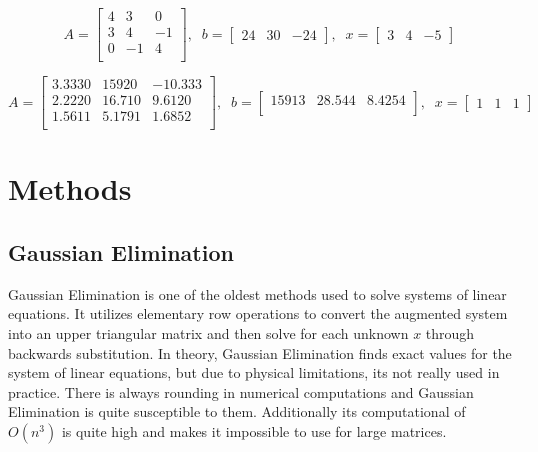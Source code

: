 \documentclass[11pt]{article}	%
\begin{document}
\begin{equation}\label{eq:sample3}
    A = \begin{bmatrix}
            4 & 3 & 0 \\
            3 & 4 & -1 \\
            0 & -1 & 4 \\
        \end{bmatrix}
    ,\;\;
    b = \begin{bmatrix}
            24 & 30 & -24
        \end{bmatrix}
    ,\;\;
    x = \begin{bmatrix}
            3 & 4 & -5
        \end{bmatrix}
\end{equation}

\begin{equation}\label{eq:sample4}
    A = \begin{bmatrix}
            3.3330 & 15920 & -10.333\\
            2.2220 & 16.710 & 9.6120\\
            1.5611 & 5.1791 & 1.6852\\
        \end{bmatrix}
    ,\;\;
    b = \begin{bmatrix}
            15913 & 28.544 & 8.4254\\
        \end{bmatrix}
    ,\;\;
    x = \begin{bmatrix}
            1 & 1 & 1
        \end{bmatrix}
\end{equation}

\section{Methods}

\subsection{Gaussian Elimination}
Gaussian Elimination is one of the oldest methods used to solve systems of linear equations. It utilizes elementary row operations to convert the augmented system into an upper triangular matrix and then solve for each unknown $x$ through backwards substitution. In theory, Gaussian Elimination finds exact values for the system of linear equations, but due to physical limitations, its not really used in practice. There is always rounding in numerical computations and Gaussian Elimination is quite susceptible to them. Additionally its computational of $O(n^3)$ is quite high and makes it impossible to use for large matrices. 
\end{document}
